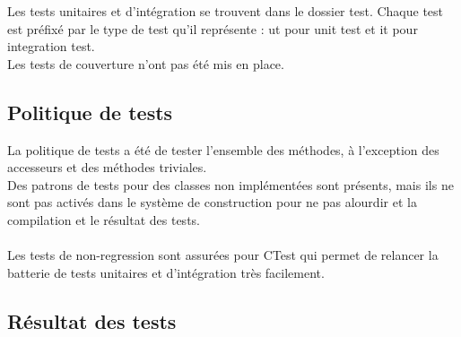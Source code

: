 Les tests unitaires et d'intégration se trouvent dans le dossier test. Chaque test est préfixé par le type de test qu'il représente : ut pour unit test et it pour integration test.\\
Les tests de couverture n'ont pas été mis en place.
\subsection{Politique de tests}

La politique de tests a été de tester l'ensemble des méthodes, à l'exception des accesseurs et des méthodes triviales.\\
Des patrons de tests pour des classes non implémentées sont présents, mais ils ne sont pas activés dans le système de construction pour ne pas alourdir et la compilation et le résultat des tests.\\\\

Les tests de non-regression sont assurées pour CTest qui permet de relancer la batterie de tests unitaires et d'intégration très facilement.

\subsection{Résultat des tests}

